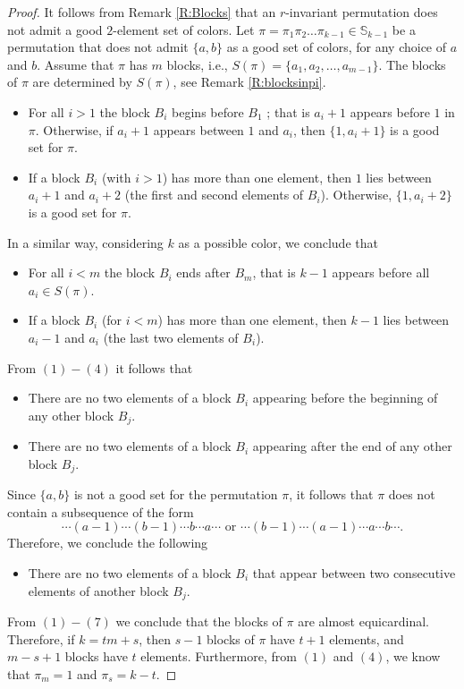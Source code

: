 \documentclass[10pt,a4paper]{amsart}
\begin{document}
\begin{proof}
It follows from Remark \ref{R:Blocks} that an $r$-invariant
permutation does not admit a good $2$-element set of colors. Let
$\pi=\pi_1\pi_2\ldots \pi_{k-1}\in \mathbb{S}_{k-1}$ be a
permutation that does not admit $\{a,b\}$ as a good set of colors,
for any choice of $a$ and $b$. Assume that $\pi$ has $m$ blocks,
i.e., $S(\pi)=\{a_1,a_2,\ldots,a_{m-1}\}$. The blocks of $\pi$ are
determined by $S(\pi)$, see Remark \ref{R:blocksinpi}.
\begin{itemize}
   \item[(1)] For all $i>1$ the block $B_i$ begins before $B_1$
   ; that is $a_{i}+1$ appears before $1$ in $\pi$.
    Otherwise, if $a_{i}+1$ appears between $1$ and $a_i$, then
    $\{1,a_{i}+1\}$ is a good set for $\pi$.
    \item[(2)] If a block $B_i$ (with $i>1$) has more than one element,
     then $1$ lies
    between $a_{i}+1$ and $a_{i}+2$ (the first and second
    elements of $B_i$).
    Otherwise, $\{1,a_{i}+2\}$ is a good set for $\pi$.
\end{itemize}
In a similar way, considering $k$ as a possible color, we conclude
that
 \begin{itemize}
    \item[(3)] For all $i<m$ the block $B_i$ ends after $B_m$,
   that is $k-1$ appears before all $a_i\in
    S(\pi)$.
     \item[(4)] If a block $B_i$ (for $i<m$) has more than one element,
      then $k-1$ lies
    between $a_{i}-1$ and $a_{i}$ (the last two
    elements of $B_i$).
\end{itemize}
From $(1)-(4)$ it follows that
     \begin{itemize}
    \item[(5)] There are no two elements of a block $B_i$ appearing
    before the
    beginning of any other block $B_j$.
    \item[(6)] There are no two elements of a block $B_i$ appearing
    after the end
    of any other block $B_j$.
\end{itemize}
Since $\{a,b\}$ is not a good set for the permutation $\pi$, it
follows that $\pi$ does not contain a subsequence of the form
$$\cdots (a-1)\cdots (b-1)\cdots b \cdots a \cdots \textrm{ or }
\cdots (b-1)\cdots (a-1) \cdots a \cdots b\cdots. $$ Therefore, we
conclude the following
  \begin{itemize}
    \item[(7)] There are no two elements of a block $B_i$ that appear
    between
    two consecutive elements of another block $B_j$.
    \end{itemize}
    From $(1)-(7)$ we conclude that the blocks of $\pi$ are almost
    equicardinal.
    Therefore, if $k=tm+s$, then $s-1$ blocks of $\pi$ have $t+1$
elements, and $m-s+1$ blocks have $t$ elements. Furthermore, from
$(1)$ and $(4)$, we know that $\pi_m=1$ and $\pi_{s}=k-t$.


\end{proof}
\end{document}
